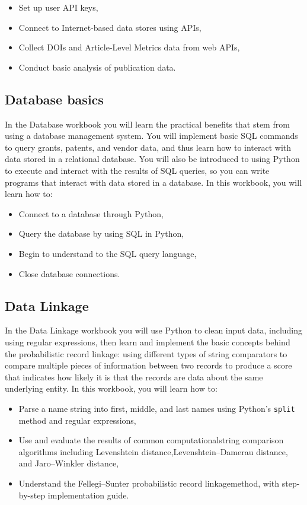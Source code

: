 \documentclass[]{krantz}
\begin{document}
\begin{itemize}
\item
  Set up user API keys,
\item
  Connect to Internet-based data stores using APIs,
\item
  Collect DOIs and Article-Level Metrics data from web APIs,
\item
  Conduct basic analysis of publication data.
\end{itemize}

\subsection{Database basics}\label{database-basics}

In the Database workbook you will learn the practical benefits that stem
from using a database management system. You will implement basic SQL
commands to query grants, patents, and vendor data, and thus learn how
to interact with data stored in a relational database. You will also be
introduced to using Python to execute and interact with the results of
SQL queries, so you can write programs that interact with data stored in
a database. In this workbook, you will learn how to:

\begin{itemize}
\item
  Connect to a database through Python,
\item
  Query the database by using SQL in Python,
\item
  Begin to understand to the SQL query language,
\item
  Close database connections.
\end{itemize}

\subsection{Data Linkage}\label{data-linkage}

In the Data Linkage workbook you will use Python to clean input data,
including using regular expressions, then learn and implement the basic
concepts behind the probabilistic record linkage: using different types
of string comparators to compare multiple pieces of information between
two records to produce a score that indicates how likely it is that the
records are data about the same underlying entity. In this workbook, you
will learn how to:

\begin{itemize}
\item
  Parse a name string into first, middle, and last names using Python's
  \texttt{split} method and regular expressions,
\item
  Use and evaluate the results of common computationalstring comparison
  algorithms including Levenshtein distance,Levenshtein--Damerau
  distance, and Jaro--Winkler distance,
\item
  Understand the Fellegi--Sunter probabilistic record linkagemethod,
  with step-by-step implementation guide.
\end{itemize}
\end{document}
